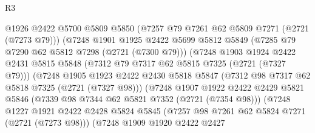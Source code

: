 \begin{lexlean}{R3}
\begin{coremodule}
                                  @1926
                                  @2422
                                  @5700
                                  @5809
                                  @5850
                                  (@7257 @79 @7261 @62 @5809 @7271 (@2721 (@7273 @79)))
                                  (@7248
                                    @1901
                                    @1925
                                    @2422
                                    @5699
                                    @5812
                                    @5849
                                    (@7285 @79 @7290 @62 @5812 @7298 (@2721 (@7300 @79)))
                                    (@7248
                                      @1903
                                      @1924
                                      @2422
                                      @2431
                                      @5815
                                      @5848
                                      (@7312 @79 @7317 @62 @5815 @7325 (@2721 (@7327 @79)))
                                      (@7248
                                        @1905
                                        @1923
                                        @2422
                                        @2430
                                        @5818
                                        @5847
                                        (@7312 @98 @7317 @62 @5818 @7325 (@2721 (@7327 @98)))
                                        (@7248
                                          @1907
                                          @1922
                                          @2422
                                          @2429
                                          @5821
                                          @5846
                                          (@7339 @98 @7344 @62 @5821 @7352 (@2721 (@7354 @98)))
                                          (@7248
                                            @1227
                                            @1921
                                            @2422
                                            @2428
                                            @5824
                                            @5845
                                            (@7257 @98 @7261 @62 @5824 @7271 (@2721 (@7273 @98)))
                                            (@7248
                                              @1909
                                              @1920
                                              @2422
                                              @2427

\end{coremodule}
\end{lexlean}
